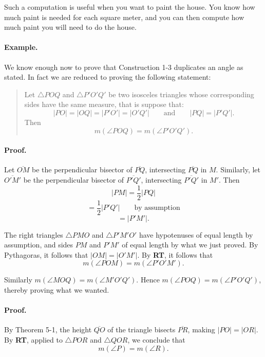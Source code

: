 \documentclass[12pt]{book} %
\begin{document}
Such a computation is useful when you want to paint the house. You know how much paint is needed for each square meter, and you can then compute how much paint you will need to do the house.

\paragraph{Example.}
We know enough now to prove that Construction 1-3 duplicates an angle as stated. In fact we are reduced to proving the following statement:

\begin{quote}
Let $\triangle POQ$ and $\triangle P'O'Q'$ be two isosceles triangles whose corresponding sides have the same measure, that is suppose that:
\[
|PO|=|OQ|=|P'O'|=|O'Q'|
\qquad \text{and} \qquad
|PQ|=|P'Q'|.
\]
Then
\[
m(\angle POQ)=m(\angle P'O'Q').
\]
\end{quote}


\paragraph{Proof.}
Let $\overline{OM}$ be the perpendicular bisector of $\overline{PQ}$, intersecting $\overline{PQ}$ in $M$. Similarly, let $\overline{O'M'}$ be the perpendicular bisector of $\overline{P'Q'}$, intersecting $\overline{P'Q'}$ in $M'$. Then
\[
|PM|=\frac12|PQ|
\]
\[
=\frac12|P'Q'| \qquad \text{by assumption}
\]
\[
=|P'M'|.
\]

The right triangles $\triangle PMO$ and $\triangle P'M'O'$ have hypotenuses of equal length by assumption, and sides $PM$ and $P'M'$ of equal length by what we just proved. By Pythagoras, it follows that $|OM|=|O'M'|$. By \textbf{RT}, it follows that
\[
m(\angle POM)=m(\angle P'O'M').
\]

Similarly $m(\angle MOQ)=m(\angle M'O'Q')$. Hence $m(\angle POQ)=m(\angle P'O'Q')$, thereby proving what we wanted.



\paragraph{Proof.}
By Theorem 5-1, the height $\overline{QO}$ of the triangle bisects $\overline{PR}$, making $|PO|=|OR|$. By \textbf{RT}, applied to $\triangle POR$ and $\triangle QOR$, we conclude that
\[
m(\angle P)=m(\angle R).
\]
\end{document}
